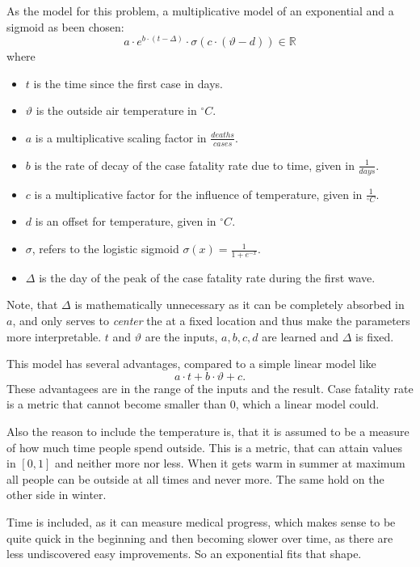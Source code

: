 \documentclass{article}
\begin{document}
As the model for this problem, a multiplicative model of an exponential and a sigmoid as been chosen: \begin{equation}
  a \cdot e^{b \cdot (t - \Delta)} \cdot \sigma \left( c \cdot (\vartheta - d) \right) \in \mathbb{R}
\end{equation} where \begin{itemize}
  \item $t$ is the time since the first case in days.
  \item $\vartheta$ is the outside air temperature in $^\circ C$.
  \item $a$ is a multiplicative scaling factor in $\frac{deaths}{cases}$.
  \item $b$ is the rate of decay of the case fatality rate due to time, given in $\frac{1}{days}$.
  \item $c$ is a multiplicative factor for the influence of temperature, given in $\frac{1}{^\circ C}$.
  \item $d$ is an offset for temperature, given in $^\circ C$.
  \item $\sigma$, refers to the logistic sigmoid $\sigma(x) = \frac{1}{1 + e^{-x}}$.
  \item $\Delta$ is the day of the peak of the case fatality rate during the first wave.
\end{itemize}

Note, that $\Delta$ is mathematically unnecessary as it can be completely absorbed in $a$, and only serves to \textit{center} the at a fixed location and thus make the parameters more interpretable. $t$ and $\vartheta$ are the inputs, $a, b, c, d$ are learned and $\Delta$ is fixed.

This model has several advantages, compared to a simple linear model like \begin{equation}
  a \cdot t + b \cdot \vartheta + c.
\end{equation}
These advantagees are in the range of the inputs and the result. Case fatality rate is a metric that cannot become smaller than 0, which a linear model could. 

Also the reason to include the temperature is, that it is assumed to be a measure of how much time people spend outside. This is a metric, that can attain values in $[0, 1]$ and neither more nor less. When it gets warm in summer at maximum all people can be outside at all times and never more. The same hold on the other side in winter. 

Time is included, as it can measure medical progress, which makes sense to be quite quick in the beginning and then becoming slower over time, as there are less undiscovered easy improvements. So an exponential fits that shape.
\end{document}
